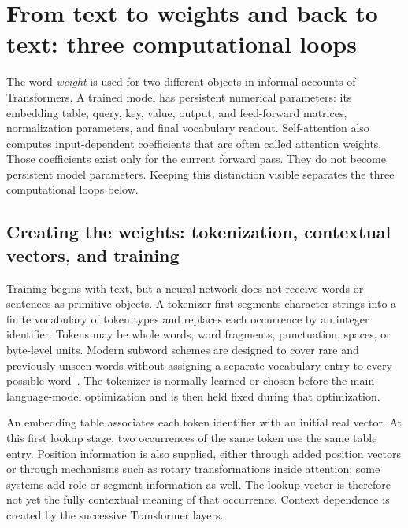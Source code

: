 \documentclass[
  aps,
  reprint,
  superscriptaddress,
  floatfix,
  nofootinbib,
  longbibliography
]{revtex4-2}
\begin{document}
\section{From text to weights and back to text: three computational loops}
\label{sec:llm-loops}

The word \emph{weight} is used for two different objects in informal accounts
of Transformers.  A trained model has persistent numerical parameters: its
embedding table, query, key, value, output, and feed-forward matrices,
normalization parameters, and final vocabulary readout.  Self-attention also
computes input-dependent coefficients that are often called attention
weights.  Those coefficients exist only for the current forward pass.  They
do not become persistent model parameters.  Keeping this distinction visible
separates the three computational loops below.

\subsection{Creating the weights: tokenization, contextual vectors, and training}
\label{sec:prose-training}

Training begins with text, but a neural network does not receive words or
sentences as primitive objects.  A tokenizer first segments character strings
into a finite vocabulary of token types and replaces each occurrence by an
integer identifier.  Tokens may be whole words, word fragments, punctuation,
spaces, or byte-level units.  Modern subword schemes are designed to cover
rare and previously unseen words without assigning a separate vocabulary
entry to every possible word~\cite{sennrich2016subword,Brown2020May}.  The
tokenizer is normally learned or chosen before the main language-model
optimization and is then held fixed during that optimization.

An embedding table associates each token identifier with an initial real
vector.  At this first lookup stage, two occurrences of the same token use the
same table entry.  Position information is also supplied, either through
added position vectors or through mechanisms such as rotary transformations
inside attention; some systems add role or segment information as well.  The
lookup vector is therefore not yet the fully contextual meaning of that
occurrence.  Context dependence is created by the successive Transformer
layers.
\end{document}
